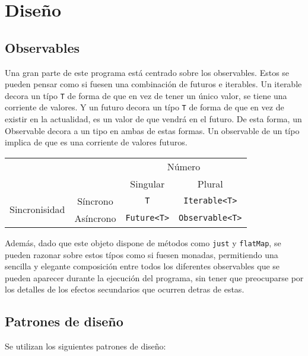 \documentclass{article}
\begin{document}
\section{Diseño}

\subsection{Observables}

Una gran parte de este programa está centrado sobre los observables.
Estos se pueden pensar como si fuesen una combinación de futuros e iterables.
Un iterable decora un típo \texttt{T} de forma de que en vez de tener un único valor,
se tiene una corriente de valores.
Y un futuro decora un típo \texttt{T} de forma de que en vez de existir en la actualidad,
es un valor de que vendrá en el futuro.
De esta forma, un Observable decora a un tipo en ambas de estas formas.
Un observable de un típo implica de que es una corriente de valores futuros.

\begin{center}
\begin{tabular}{cc|c|c|}
	\cline{3-4}
	& & \multicolumn{2}{c|}{Número} \\
	\cline{3-4} 
	& & Singular & Plural \\
	\cline{1-4}
	\multicolumn{1}{|c}{\multirow{2}{*}{Sincronisidad}} &
	\multicolumn{1}{|c|}{Síncrono} & \texttt{T} & \texttt{Iterable<T>} \\
	\cline{2-4}
	\multicolumn{1}{|c}{} &
	\multicolumn{1}{|c|}{Asíncrono} & \texttt{Future<T>} & \texttt{Observable<T>} \\
	\cline{1-4}
\end{tabular}
\end{center}

Además, dado que este objeto dispone de métodos como \texttt{just} y \texttt{flatMap},
se pueden razonar sobre estos típos como si fuesen monadas, permitiendo una sencilla y elegante composición
entre todos los diferentes observables que se pueden aparecer durante la ejecución del programa, sin tener que
preocuparse por los detalles de los efectos secundarios que ocurren detras de estas.

\subsection{Patrones de diseño}

Se utilizan los siguientes patrones de diseño:
\end{document}
